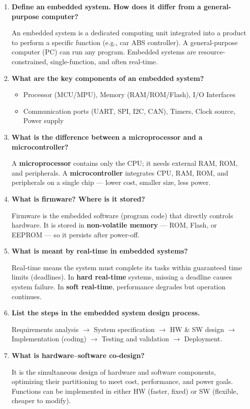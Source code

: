 \documentclass[12pt,a4paper]{article}
\newcommand{\Q}[1]{\textbf{#1}\par\noindent\ignorespaces}
\begin{document}
\begin{tcolorbox}[exambox, title={\textbf{Frequently Asked / Viva Questions}}]
\begin{enumerate}[topsep=0pt, label=\textbf{Q\arabic*.}, itemsep=5pt]
  \item \Q{Define an embedded system. How does it differ from a general-purpose computer?}
    An embedded system is a dedicated computing unit integrated into a product to perform a specific function (e.g., car ABS controller). A general-purpose computer (PC) can run any program. Embedded systems are resource-constrained, single-function, and often real-time.
  \item \Q{What are the key components of an embedded system?}
    \begin{itemize}[leftmargin=*, itemsep=1pt, topsep=2pt]
      \item Processor (MCU/MPU), Memory (RAM/ROM/Flash), I/O Interfaces
      \item Communication ports (UART, SPI, I2C, CAN), Timers, Clock source, Power supply
    \end{itemize}
  \item \Q{What is the difference between a microprocessor and a microcontroller?}
    A \textbf{microprocessor} contains only the CPU; it needs external RAM, ROM, and peripherals. A \textbf{microcontroller} integrates CPU, RAM, ROM, and peripherals on a single chip --- lower cost, smaller size, less power.
  \item \Q{What is firmware? Where is it stored?}
    Firmware is the embedded software (program code) that directly controls hardware. It is stored in \textbf{non-volatile memory} --- ROM, Flash, or EEPROM --- so it persists after power-off.
  \item \Q{What is meant by real-time in embedded systems?}
    Real-time means the system must complete its tasks within guaranteed time limits (deadlines). In \textbf{hard real-time} systems, missing a deadline causes system failure. In \textbf{soft real-time}, performance degrades but operation continues.
  \item \Q{List the steps in the embedded system design process.}
    Requirements analysis $\to$ System specification $\to$ HW \& SW design $\to$ Implementation (coding) $\to$ Testing and validation $\to$ Deployment.
  \item \Q{What is hardware--software co-design?}
    It is the simultaneous design of hardware and software components, optimizing their partitioning to meet cost, performance, and power goals. Functions can be implemented in either HW (faster, fixed) or SW (flexible, cheaper to modify).

\end{enumerate}
\end{tcolorbox}
\end{document}
